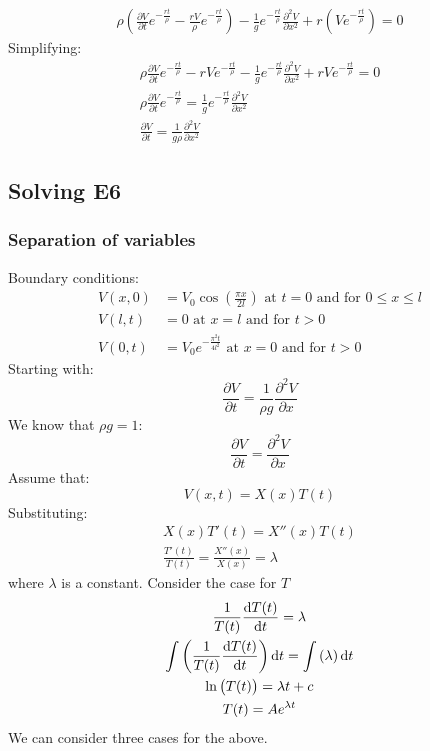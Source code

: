 \documentclass[11pt]{article}
\numberwithin{equation}{section}
\begin{document}
\begin{gather}
    \rho\left(\frac{\partial V }{\partial t} e^{-\frac{rt}{\rho}} - \frac{rV}{\rho} e^{-\frac{rt}{\rho}}\right) - \frac{1}{g}e^{-\frac{rt}{\rho}}\frac{\partial^2 V}{\partial x^2} + r\left(V e^{-\frac{rt}{\rho}}\right) = 0
\end{gather}
Simplifying:
\begin{gather}
    \rho \frac{\partial V }{\partial t} e^{-\frac{rt}{\rho}} - rVe^{-\frac{rt}{\rho}}- \frac{1}{g}e^{-\frac{rt}{\rho}}\frac{\partial^2 V}{\partial x^2} + rVe^{-\frac{rt}{\rho}} = 0\\
    \rho \frac{\partial V }{\partial t} e^{-\frac{rt}{\rho}} = \frac{1}{g}e^{-\frac{rt}{\rho}}\frac{\partial^2 V}{\partial x^2}\\
    \frac{\partial V }{\partial t} = \frac{1}{g\rho}\frac{\partial^2 V}{\partial x^2}
\end{gather}
\subsection{Solving E6}
\subsubsection{Separation of variables}
Boundary conditions:
\begin{align}
    V(x,0) &= V_0 \cos\left(\frac{\pi x}{2l}\right) \textrm{ at } t=0 \textrm{ and for } 0 \leq x \leq l\\
    V(l,t) &= 0 \textrm{ at } x = l \textrm{ and for } t > 0\\
    V(0,t) &= V_0e^{-\frac{\pi^2 t}{4l^2}} \textrm{ at } x = 0 \textrm{ and for } t > 0
\end{align}
Starting with:
\begin{equation}
    \frac{\partial V}{\partial t} = \frac{1}{\rho g }\frac{\partial^2 V}{\partial x}
\end{equation}
We know that $\rho g = 1$:
\begin{equation}
    \frac{\partial V}{\partial t} = \frac{\partial^2 V}{\partial x}
\end{equation}
Assume that:
\begin{equation}
    V(x,t) = X(x)T(t)
\end{equation}
Substituting:
\begin{gather}
    X(x)T'(t) = X''(x)T(t)\\
    \frac{T'(t)}{T(t)} = \frac{X''(x)}{X(x)} = \lambda
\end{gather}
where $\lambda$ is a constant. Consider the case for $T$
\begin{gather}
    \frac{1}{T(t)}\frac{\dif T(t)}{\dif t} = \lambda\\
    \int \left(\frac{1}{T(t)}\frac{\dif T(t)}{\dif t}\right) \dif t = \int \left(\lambda \right) \dif t\\
    \ln\left(T(t)\right) = \lambda t + c\\
    T(t) = Ae^{\lambda t}
\end{gather}
We can consider three cases for the above. 
\end{document}
